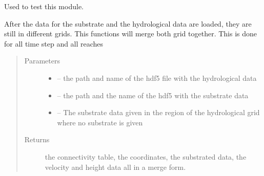 \documentclass[letterpaper,10pt,english]{sphinxmanual}
\begin{document}

\begin{fulllineitems}
\label{\detokenize{index:src.substrate.main}}
Used to test this module.

\end{fulllineitems}


\begin{fulllineitems}
\label{\detokenize{index:src.substrate.merge_grid_hydro_sub}}
After the data for the substrate and the hydrological data are loaded, they are still in different grids.
This functions will merge both grid together. This is done for all time step and all reaches
\begin{quote}\begin{description}
\item[{Parameters}] \leavevmode\begin{itemize}
\item {} 
 -- the path and name of the hdf5 file with the hydrological data

\item {} 
 -- the path and the name of the hdf5 with the substrate data

\item {} 
 -- The substrate data given in the region of the hydrological grid where no substrate is given

\end{itemize}

\item[{Returns}] \leavevmode
the connectivity table, the coordinates, the substrated data, the velocity and height data all in a merge form.

\end{description}\end{quote}

\end{fulllineitems}

\end{document}
